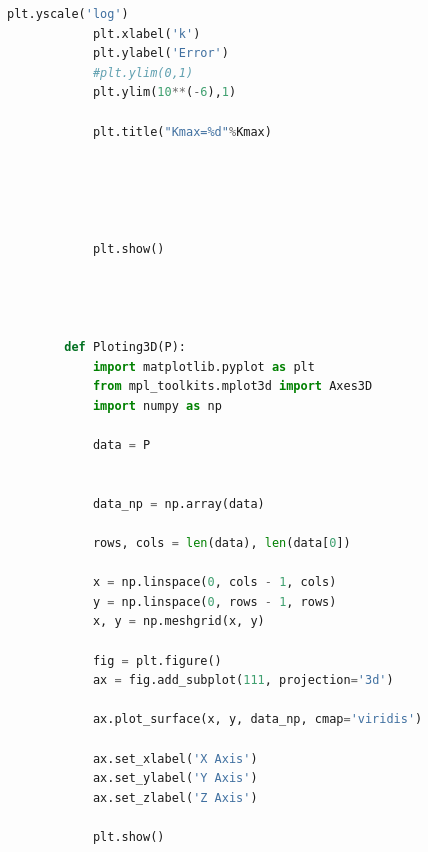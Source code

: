 \documentclass[12pt]{article}
\begin{document}
\begin{scriptsize}
\begin{lstlisting}[language=python,caption={Python code-Functions for Iteration Solver and Result Analysist}]
            plt.yscale('log')
            plt.xlabel('k')
            plt.ylabel('Error')
            #plt.ylim(0,1)
            plt.ylim(10**(-6),1)
        
            plt.title("Kmax=%d"%Kmax)
        
        
        
        
        
            plt.show()
        
        
        
        
        def Ploting3D(P):
            import matplotlib.pyplot as plt
            from mpl_toolkits.mplot3d import Axes3D
            import numpy as np
        
            data = P
        
        
            data_np = np.array(data)
        
            rows, cols = len(data), len(data[0])
        
            x = np.linspace(0, cols - 1, cols)
            y = np.linspace(0, rows - 1, rows)
            x, y = np.meshgrid(x, y)
        
            fig = plt.figure()
            ax = fig.add_subplot(111, projection='3d')
        
            ax.plot_surface(x, y, data_np, cmap='viridis')
        
            ax.set_xlabel('X Axis')
            ax.set_ylabel('Y Axis')
            ax.set_zlabel('Z Axis')
        
            plt.show()
        
        
         
                
        
    \end{lstlisting}
    \end{scriptsize}
    
    
    
    
    
    
    
    
    
\end{document}
